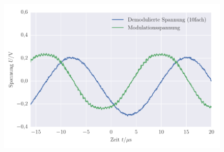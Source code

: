 
\FloatBarrier\begin{figure}[!h]
\centering
\includegraphics[scale=1]{../Grafiken/Amplituden_Modulation_Ring_Demodulation.pdf}
\caption{\label{fig:amplituden_modulation_ring_demodulation}}
\end{figure}
\FloatBarrier